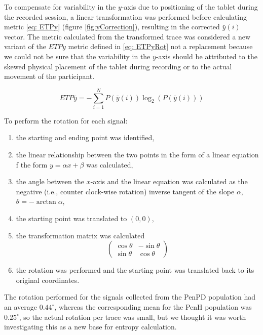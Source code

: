 To compensate for variability in the $y$-axis due to positioning of the tablet during the recorded session, a linear transformation was performed before calculating metric \ref{eq: ETPy} (figure \ref{fig:yCorrection}), resulting in the corrected $\bar{y}(i)$ vector. The metric calculated from the transformed trace was considered a new variant of the $ETPy$ metric defined in \ref{eq: ETPyRot} not a replacement because we could not be sure that the variability in the $y$-axis should be attributed to the skewed physical placement of the tablet during recording or to the actual movement of the participant. 

\begin{equation} \label{eq: ETPyRot}
ETP\bar{y} = -\sum_{i=1}^{N}P(\bar{y}(i))\log_{2}(P(\bar{y}(i)))
\end{equation}

To perform the rotation for each signal:
\begin{enumerate}
\item the starting and ending point was identified,
\item the linear relationship between the two points in the form of a linear equation f the form $y = {\alpha}x+{\beta}$ was calculated,
\item the angle between the $x$-axis and the linear equation was calculated as the negative (i.e., counter clock-wise rotation) inverse tangent of the slope ${\alpha}$, ${\theta}=-\arctan{\alpha}$,
\item the starting point was translated to $(0,0)$,
\item the transformation matrix was calculated
\begin{equation}
\begin{pmatrix}
\cos{\theta} & -\sin{\theta} \\
\sin{\theta} & \cos{\theta}
\end{pmatrix}
\end{equation}
\item the rotation was performed and the starting point was translated back to its original coordinates. 
\end{enumerate}
The rotation performed for the signals collected from the \gls{PenPD} population had an average $0.44^{\circ}$, whereas the corresponding mean for the \gls{PenH} population was $0.25^{\circ}$, so the actual rotation per trace was small, but we thought it was worth investigating this as a new base for entropy calculation. 

